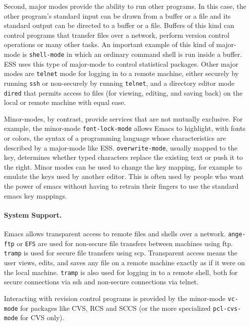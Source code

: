\documentclass{article}
\newcommand{\stexttt}[1]{{\small\texttt{#1}}}
\newcommand{\ssf}[1]{{\small\sf{#1}}}
\begin{document}
Second, major modes provide the ability to run other programs.  In
this case, the other program's standard input can be drawn from a
buffer or a file and its standard output can be directed to a buffer
or a file.  Buffers of this kind can control programs that transfer
files over a network, perform version control operations or many other
tasks.  An important example of this kind of major-mode is
\stexttt{shell-mode} in which an ordinary command shell is run inside
a buffer.  ESS uses this type of major-mode to control statistical
packages.  Other major modes are \stexttt{telnet} mode for logging in
to a remote machine, either securely by running \stexttt{ssh} or
non-securely by running \stexttt{telnet}, and a directory editor mode
\stexttt{dired} that permits access to files (for viewing, editing,
and saving back) on the local or remote machine with equal ease.

Minor-modes, by contrast, provide services that are not mutually
exclusive.  For example, the minor-mode \stexttt{font-lock-mode}
allows Emacs to highlight, with fonts or colors, the syntax of a
programming language whose characteristics are described by a
major-mode like ESS.  \stexttt{overwrite-mode}, usually mapped to the
\ssf{Insert} key, determines whether typed characters replace the
existing text or push it to the right.  Minor modes can be used to
change the key mapping, for example to emulate the keys used by
another editor.  This is often used by people who want the power of
emacs without having to retrain their fingers to use the standard
emacs key mappings.


\paragraph{System Support.}
Emacs allows transparent access to remote files and
shells over a network.  \stexttt{ange-ftp} or \stexttt{EFS} are used
for non-secure file transfers between machines using ftp.
\stexttt{tramp} is used for secure file transfers using scp.
Transparent access means the user views, edits, and saves any file on
a remote machine exactly as if it were on the local machine.
\stexttt{tramp} is also used for logging in to a remote shell, both
for secure connections via ssh and non-secure connections via telnet.

Interacting with revision control
programs is provided by the minor-mode \stexttt{vc-mode} for packages
like CVS, RCS and SCCS (or the more
specialized \stexttt{pcl-cvs-mode} for CVS only).
\end{document}
